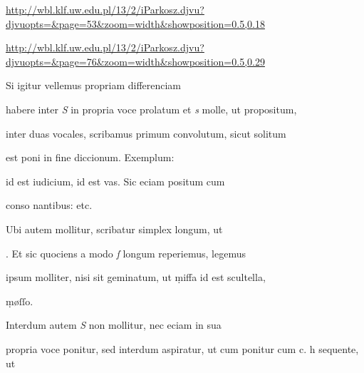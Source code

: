 
\newParkoszpage

{
\url{http://wbl.klf.uw.edu.pl/13/2/iParkosz.djvu?djvuopts=&page=53&zoom=width&showposition=0.5,0.18}

\url{http://wbl.klf.uw.edu.pl/13/2/iParkosz.djvu?djvuopts=&page=76&zoom=width&showposition=0.5,0.29}
}

\bigskip

\obeylines
\mono



\fullpreviouslines


{
\color{blue}



\indentK Si igitur vellemus propriam differenciam

\fulllines

habere inter \textit{S} in propria voce prolatum et \textit{s} molle, ut propositum,
}


\fulllines

inter duas vocales, scribamus primum convolutum, sicut solitum

est poni in fine diccionum. Exemplum:   

 id est iudicium,  id est vas. Sic eciam positum cum

conso nantibus:      etc.

Ubi autem mollitur, scribatur simplex longum, ut 

. Et sic quociens a modo \textit{ſ} longum reperiemus, legemus

ipsum molliter, nisi sit geminatum, ut ṃiffa id est scultella,

\splitlines

ṃøſſo.

\indentK Interdum autem \textit{S} non mollitur, nec eciam in sua

\fulllines

propria voce ponitur, sed interdum aspiratur, ut cum ponitur cum
 c. h sequente, ut   

\splitlines

